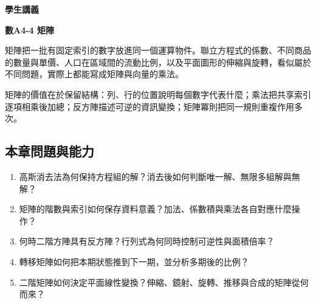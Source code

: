 \documentclass[11pt,a4paper]{article}
\providecommand{\tightlist}{%
  \setlength{\itemsep}{0pt}\setlength{\parskip}{0pt}}
\begin{document}
\begin{tcolorbox}[
  enhanced,colback=white,colframe=HandoutBlue,boxrule=1.1pt,arc=2mm,
  borderline west={3pt}{0pt}{HandoutBlue},left=5mm,right=4mm,top=4mm,bottom=4mm
]
{\sffamily\small\bfseries\color{HandoutBlue}學生講義}\par
{\sffamily\bfseries\LARGE\color{HandoutInk}數A4-4 矩陣}\par
\vspace{0.35em}{\large 用列運算解多變數系統，以矩陣組合資料、機率狀態與平面變換}\par
{}\par
{}\par
\end{tcolorbox}


矩陣把一批有固定索引的數字放進同一個運算物件。聯立方程式的係數、不同商品的數量與單價、人口在區域間的流動比例，以及平面圖形的伸縮與旋轉，看似屬於不同問題，實際上都能寫成矩陣與向量的乘法。

矩陣的價值在於保留結構：列、行的位置說明每個數字代表什麼；乘法把共享索引逐項相乘後加總；反方陣描述可逆的資訊變換；矩陣冪則把同一規則重複作用多次。

\begin{HandoutLearningMap}

\subsection{本章問題與能力}\label{ux672cux7ae0ux554fux984cux8207ux80fdux529b}

\begin{enumerate}
\def\labelenumi{\arabic{enumi}.}
\tightlist
\item
  高斯消去法為何保持方程組的解？消去後如何判斷唯一解、無限多組解與無解？
\item
  矩陣的階數與索引如何保存資料意義？加法、係數積與乘法各自對應什麼操作？
\item
  何時二階方陣具有反方陣？行列式為何同時控制可逆性與面積倍率？
\item
  轉移矩陣如何把本期狀態推到下一期，並分析多期後的比例？
\item
  二階矩陣如何決定平面線性變換？伸縮、鏡射、旋轉、推移與合成的矩陣從何而來？
\end{enumerate}

\end{HandoutLearningMap}
\end{document}
